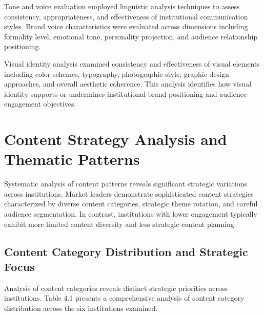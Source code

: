 \documentclass[12pt]{report}
\begin{document}
Tone and voice evaluation employed linguistic analysis techniques to assess consistency, appropriateness, and effectiveness of institutional communication styles. Brand voice characteristics were evaluated across dimensions including formality level, emotional tone, personality projection, and audience relationship positioning.

Visual identity analysis examined consistency and effectiveness of visual elements including color schemes, typography, photographic style, graphic design approaches, and overall aesthetic coherence. This analysis identifies how visual identity supports or undermines institutional brand positioning and audience engagement objectives.

\chapter{Content Strategy Analysis and Thematic Patterns}

Systematic analysis of content patterns reveals significant strategic variations across institutions. Market leaders demonstrate sophisticated content strategies characterized by diverse content categories, strategic theme rotation, and careful audience segmentation. In contrast, institutions with lower engagement typically exhibit more limited content diversity and less strategic content planning.

\section{Content Category Distribution and Strategic Focus}

Analysis of content categories reveals distinct strategic priorities across institutions. Table 4.1 presents a comprehensive analysis of content category distribution across the six institutions examined.
\end{document}
